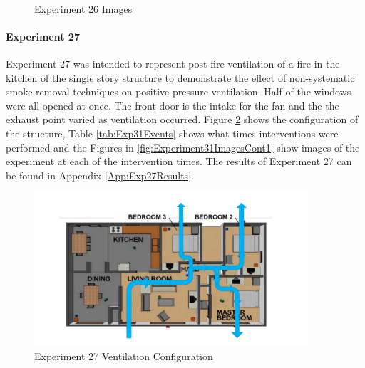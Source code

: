 \documentclass{article}
\begin{document}
\begin{figure}[H]
	\ContinuedFloat 
	\centering 
	 \ 
	\caption{Experiment 26 Images}
	\label{fig:Experiment30ImagesCont4} 
\end{figure}

\paragraph{Experiment 27} \mbox{}

Experiment 27 was intended to represent post fire ventilation of a fire in the kitchen of the single story structure to demonstrate the effect of non-systematic smoke removal techniques on positive pressure ventilation. Half of the windows were all opened at once. The front door is the intake for the fan and the the exhaust point varied as ventilation occurred. Figure \ref{fig:Exp31VentConfig} shows the configuration of the structure, Table \ref{tab:Exp31Events} shows what times interventions were performed and the Figures in \ref{fig:Experiment31ImagesCont1} show images of the experiment at each of the intervention times. The results of Experiment 27 can be found in Appendix \ref{App:Exp27Results}.

\begin{figure} [H]
	\centering
	\includegraphics[width = 4in]{0_Images/Tactical_Considerations/Systematic_Vs_Non-Systematic/Non_Systematic.pdf}
	\caption{Experiment 27 Ventilation Configuration}
	\label{fig:Exp31VentConfig}
\end{figure}
\end{document}
